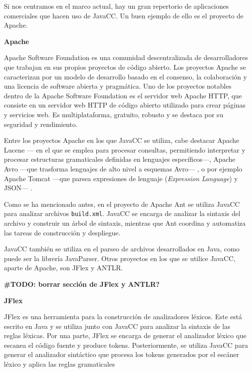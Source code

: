 Si nos centramos en el marco actual, hay un gran repertorio de aplicaciones comerciales que hacen uso de JavaCC. Un buen ejemplo de ello es el proyecto de Apache.

\phantom{text}

\noindent \textbf{Apache}

\phantom{text}

\noindent Apache Software Foundation es una comunidad descentralizada de desarrolladores que trabajan en sus propios proyectos de código abierto. Los proyectos Apache se caracterizan por un modelo de desarrollo basado en el consenso, la colaboración y una licencia de software abierta y pragmática\cite{apachepaginaoficial}. Uno de los proyectos notables dentro de la Apache Software Foundation es el servidor web Apache HTTP, que consiste en un servidor web HTTP de código abierto utilizado para crear páginas y servicios web. Es multiplataforma, gratuito, robusto y se destaca por su seguridad y rendimiento\cite{apachehttp}.

Entre los proyectos Apache en los que JavaCC se utiliza, cabe destacar Apache Lucene --- en el que se emplea para procesar consultas, permitiendo interpretar y procesar estructuras gramaticales definidas en lenguajes específicos---, Apache Avro ---que trasforma lenguajes de alto nivel a esquemas Avro--- , o por ejemplo Apache Tomcat ---que parsea expresiones de lenguaje (\textit{Expression Language})\cite{expressionlanguage} y JSON--- \cite{javaccgithub}.

Como se ha mencionado antes, en el proyecto de Apache Ant se utiliza JavaCC para analizar archivos \lstinline|build.xml|. JavaCC se encarga de analizar la sintaxis del archivo y construir un árbol de sintaxis, mientras que Ant coordina y automatiza las tareas de construcción y despliegue.

JavaCC también se utiliza en el parseo de archivos desarrollados en Java, como puede ser la librería JavaParser\cite{javaparser}. Otros proyectos en los que se utilice JavaCC, aparte de Apache, son JFlex y ANTLR.

\textbf{\#TODO: borrar sección de JFlex y ANTLR?}


\phantom{text}

\noindent \textbf{JFlex}

\phantom{text}

\noindent JFlex es una herramienta para la construcción de analizadores léxicos. Este está escrito en Java y se utiliza junto con JavaCC para analizar la sintaxis de las reglas léxicas. Por una parte, JFlex se encarga de generar el analizador léxico que escanea el código fuente y produce tokens. Posteriormente, se utiliza JavaCC para generar el analizador sintáctico que procesa los tokens generados por el escáner léxico y aplica las reglas gramaticales

